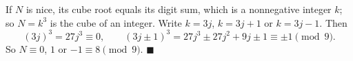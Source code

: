 If $N$ is nice, its cube root equals its digit sum, which is a nonnegative integer $k$; so $N=k^3$ is the cube of an integer. Write $k=3j$, $k=3j+1$ or $k=3j-1$. Then
\[(3j)^3=27j^3\equiv0,\qquad(3j\pm1)^3=27j^3\pm27j^2+9j\pm1\equiv\pm1\pmod9.\]
So $N\equiv0$, $1$ or $-1\equiv8\pmod9$. $\blacksquare$
